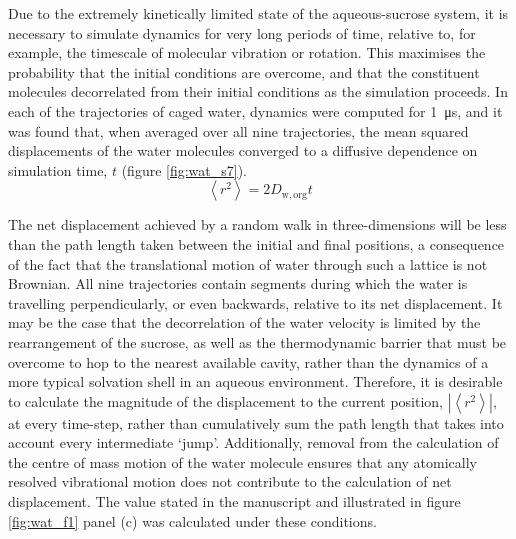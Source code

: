Due to the extremely kinetically limited state of the aqueous-sucrose system, it is necessary to simulate dynamics for very long periods of time, relative to, for example, the timescale of molecular vibration or rotation. This maximises the probability that the initial conditions are overcome, and that the constituent molecules decorrelated from their initial conditions as the simulation proceeds. In each of the trajectories of caged water, dynamics were computed for \SI{1}{\micro\second}, and it was found that, when averaged over all nine trajectories, the mean squared displacements of the water molecules converged to a diffusive dependence on simulation time, $t$ (figure \ref{fig:wat_s7}).
\begin{equation}\label{eqn:wat_msd}
\left\langle r^{2}\right\rangle=2 D_{\mathrm{w, org}} t
\end{equation}

The net displacement achieved by a random walk in three-dimensions will be less than the path length taken between the initial and final positions, a consequence of the fact that the translational motion of water through such a lattice is not Brownian. All nine trajectories contain segments during which the water is travelling perpendicularly, or even backwards, relative to its net displacement. It may be the case that the decorrelation of the water velocity is limited by the rearrangement of the sucrose, as well as the thermodynamic barrier that must be overcome to hop to the nearest available cavity, rather than the dynamics of a more typical solvation shell in an aqueous environment. Therefore, it is desirable to calculate the magnitude of the displacement to the current position, $\left|\left\langle r^{2}\right\rangle\right|$, at every time-step, rather than cumulatively sum the path length that takes into account every intermediate `jump’. Additionally, removal from the calculation of the centre of mass motion of the water molecule ensures that any atomically resolved vibrational motion does not contribute to the calculation of net displacement. The value stated in the manuscript and illustrated in figure \ref{fig:wat_f1} panel (c) was calculated under these conditions. 

